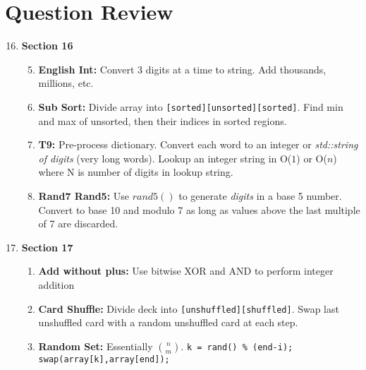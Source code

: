 \documentclass[12pt]{article}
\newcommand{\OONE}{O($1$) }
\newcommand{\ON}{O($n$) }
\begin{document}
\section{Question Review}
\begin{enumerate}
\setcounter{enumi}{15}

\item \textbf{Section 16}
\begin{enumerate}[label*=\arabic*.]
\setcounter{enumii}{4}
\item \textbf{English Int:} Convert 3 digits at a time to string. Add thousands, millions, etc.
\setcounter{enumii}{15}
\item \textbf{Sub Sort:} Divide array into \texttt{[sorted][unsorted][sorted]}. Find min and max of unsorted, then their indices in sorted regions.
\setcounter{enumii}{19}
\item \textbf{T9:} Pre-process dictionary. Convert each word to an integer or
\emph{std::string of digits} (very long words).
Lookup an integer string in \OONE or \ON where N is number of digits in lookup string.
\setcounter{enumii}{22}
\item \textbf{Rand7 Rand5:} Use $rand5()$ to generate \emph{digits} in a base 5 number. Convert to base 10 and modulo 7 as long as values above the last multiple of 7 are discarded.
\end{enumerate}

\vspace{5mm}
\item \textbf{Section 17}
\begin{enumerate}[label*=\arabic*.]
\item \textbf{Add without plus:} Use bitwise XOR and AND to perform integer addition
\item \textbf{Card Shuffle:} Divide deck into \texttt{[unshuffled][shuffled]}. Swap last unshuffled card with a random unshuffled card at each step.
\item \textbf{Random Set:} Essentially $\binom{n}{m}$. \texttt{k = rand() \% (end-i); swap(array[k],array[end]);}


\end{enumerate}
\end{enumerate}
\end{document}
